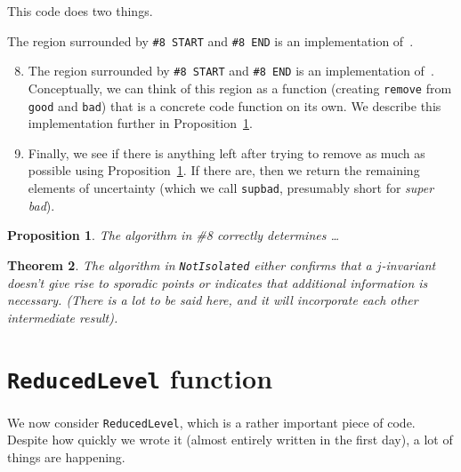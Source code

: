\documentclass[11pt,reqno]{amsart}
\theoremstyle{plain}
\newtheorem{theorem}{Theorem}%
\newtheorem{proposition}[theorem]{Proposition}
\theoremstyle{definition}
\begin{document}
This code does two things.

The region surrounded by \texttt{\#8 START} and
\texttt{\#8 END} is an implementation of~\cite{Bourdon2019}.

\begin{enumerate}\setcounter{enumi}{7}
  \item\label{item:belov} The region surrounded by \texttt{\#8 START} and
  \texttt{\#8 END} is an implementation of~\cite{Bourdon2019}. Conceptually, we
  can think of this region as a function (creating \texttt{remove} from
  \texttt{good} and \texttt{bad}) that is a concrete code function on its own.
  We describe this implementation further in Proposition~\ref{prop:belov}.

  \item Finally, we see if there is anything left after trying to remove
  as much as possible using Proposition~\ref{prop:belov}. If there are, then we
  return the remaining elements of uncertainty (which we call \texttt{supbad},
  presumably short for \emph{super bad}).
\end{enumerate}

\begin{proposition}\label{prop:belov}
  The algorithm in \#8 correctly determines \ldots
\end{proposition}

\begin{theorem}\label{thm:main}
  The algorithm in \texttt{NotIsolated} either confirms that a $j$-invariant doesn't
  give rise to sporadic points or indicates that additional information is
  necessary. (There is a lot to be said here, and it will incorporate each
  other intermediate result).
\end{theorem}

\clearpage
\section{\texttt{ReducedLevel} function}\label{sec:reducedlevel}

We now consider \texttt{ReducedLevel}, which is a rather important piece of
code. Despite how quickly we wrote it (almost entirely written in the first
day), a lot of things are happening.
\end{document}
